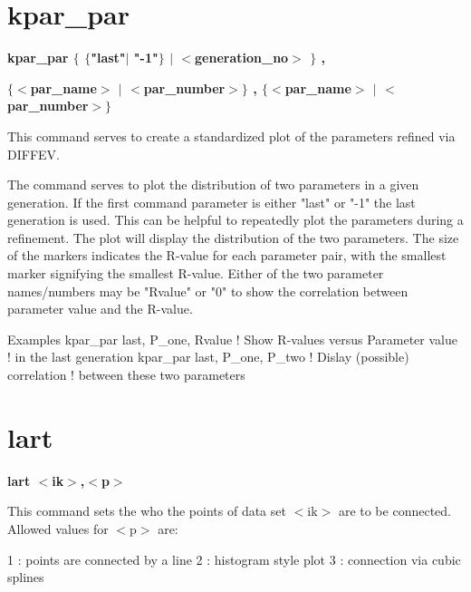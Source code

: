 \section{kpar\_par}
{\bf kpar\_par $ \{$ $ \{$"last"$| $ "-1"$\} $ $| $ $ <$generation\_no$> $ $\} $ , \par }
{\bf       $ \{$$ <$par\_name$> $ $| $ $ <$par\_number$> $$\} $ , $ \{$$ <$par\_name$> $ $| $ $ <$par\_number$> $$\} $ \par }
\vspace{3pt}
This command serves to create a standardized plot of the parameters 
refined via DIFFEV. 
\par
The command serves to plot the distribution of two parameters 
in a given generation. If the first command parameter is either 
"last" or "-1" the last generation is used. This can be helpful to 
repeatedly plot the parameters during a refinement. 
The plot will display the distribution of the two parameters. 
The size of the markers indicates the R-value for each parameter 
pair, with the smallest marker signifying the smallest R-value. 
Either of the two parameter names/numbers may be "Rvalue" or "0" 
to show the correlation between parameter value and the R-value. 
\par
Examples 
kpar\_par last, P\_one, Rvalue  ! Show R-values versus Parameter value 
                           ! in the last generation 
kpar\_par last, P\_one, P\_two   ! Dislay (possible) correlation 
                           ! between these two parameters 
\section{lart}
{\bf lart $ <$ik$> $,$ <$p$> $ \par }
\par
\vspace{3pt}
This command sets the who the points of data set $ <$ik$> $ are to be 
connected. Allowed values for $ <$p$> $ are: 
\par
\begin{MacVerbatim}
   1 : points are connected by a line
   2 : histogram style plot
   3 : connection via cubic splines
\end{MacVerbatim}
